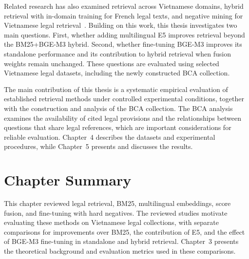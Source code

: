 Related research has also examined retrieval across Vietnamese domains, hybrid retrieval with in-domain training for French legal texts, and negative mining for Vietnamese legal retrieval~\cite{nguyenquan2026,louis2025,le2025semihard}. Building on this work, this thesis investigates two main questions. First, whether adding multilingual E5 improves retrieval beyond the BM25+BGE-M3 hybrid. Second, whether fine-tuning BGE-M3 improves its standalone performance and its contribution to hybrid retrieval when fusion weights remain unchanged. These questions are evaluated using selected Vietnamese legal datasets, including the newly constructed BCA collection.

The main contribution of this thesis is a systematic empirical evaluation of established retrieval methods under controlled experimental conditions, together with the construction and analysis of the BCA collection. The BCA analysis examines the availability of cited legal provisions and the relationships between questions that share legal references, which are important considerations for reliable evaluation. Chapter~4 describes the datasets and experimental procedures, while Chapter~5 presents and discusses the results.

\section{Chapter Summary}

This chapter reviewed legal retrieval, BM25, multilingual embeddings, score fusion, and fine-tuning with hard negatives. The reviewed studies motivate evaluating these methods on Vietnamese legal collections, with separate comparisons for improvements over BM25, the contribution of E5, and the effect of BGE-M3 fine-tuning in standalone and hybrid retrieval. Chapter~3 presents the theoretical background and evaluation metrics used in these comparisons.
